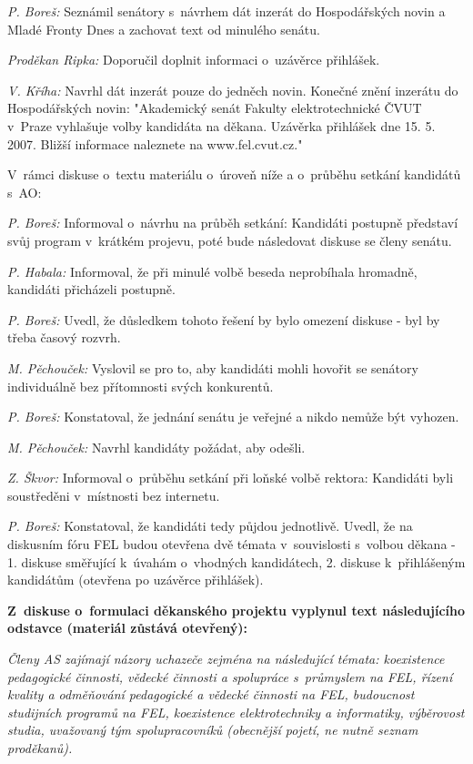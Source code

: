 \documentclass[a4paper,12pt,notitlepage,oneside]{article}
\begin{document}
\vskip 24pt

\textit{P. Boreš:} Seznámil senátory s~návrhem dát inzerát do Hospodářských novin a Mladé Fronty Dnes a zachovat text od minulého senátu.

\textit{Proděkan Ripka:} Doporučil doplnit informaci o~uzávěrce přihlášek.

\textit{V. Kříha:} Navrhl dát inzerát pouze do jedněch novin.
Konečné znění inzerátu do Hospodářských novin: "Akademický senát Fakulty elektrotechnické ČVUT v~Praze vyhlašuje volby kandidáta na děkana. Uzávěrka přihlášek dne 15. 5. 2007. Bližší informace naleznete na www.fel.cvut.cz." 

V~rámci diskuse o~textu materiálu o~úroveň níže a o~průběhu setkání kandidátů s~AO:

\textit{P. Boreš:} Informoval o~návrhu na průběh setkání: Kandidáti postupně představí svůj program v~krátkém projevu, poté bude následovat diskuse se členy senátu.

\textit{P. Habala:} Informoval, že při minulé volbě beseda neprobíhala hromadně, kandidáti přicházeli postupně.

\textit{P. Boreš:} Uvedl, že důsledkem tohoto řešení by bylo omezení diskuse - byl by třeba časový rozvrh.

\textit{M. Pěchouček:} Vyslovil se pro to, aby kandidáti mohli hovořit se senátory individuálně bez přítomnosti svých konkurentů.

\textit{P. Boreš:} Konstatoval, že jednání senátu je veřejné a nikdo nemůže být vyhozen.

\textit{M. Pěchouček:} Navrhl kandidáty požádat, aby odešli.

\textit{Z. Škvor:} Informoval o~průběhu setkání při loňské volbě rektora: Kandidáti byli soustředěni v~místnosti bez internetu.

\textit{P. Boreš:} Konstatoval, že kandidáti tedy půjdou jednotlivě. Uvedl, že na diskusním fóru FEL budou otevřena dvě témata v~souvislosti s~volbou děkana - 1. diskuse směřující k~úvahám o~vhodných kandidátech, 2. diskuse k~přihlášeným kandidátům (otevřena po uzávěrce přihlášek).

\textbf{Z~diskuse o~formulaci  děkanského projektu vyplynul text následujícího odstavce (materiál zůstává otevřený):}

{\it Členy AS zajímají názory uchazeče zejména na následující témata: koexistence pedagogické činnosti, vědecké činnosti a spolupráce s~průmyslem na FEL, řízení kvality a odměňování pedagogické a vědecké činnosti na FEL, budoucnost studijních programů na FEL, koexistence elektrotechniky a informatiky, výběrovost studia, uvažovaný tým spolupracovníků (obecnější pojetí, ne nutně seznam proděkanů).}
\end{document}
